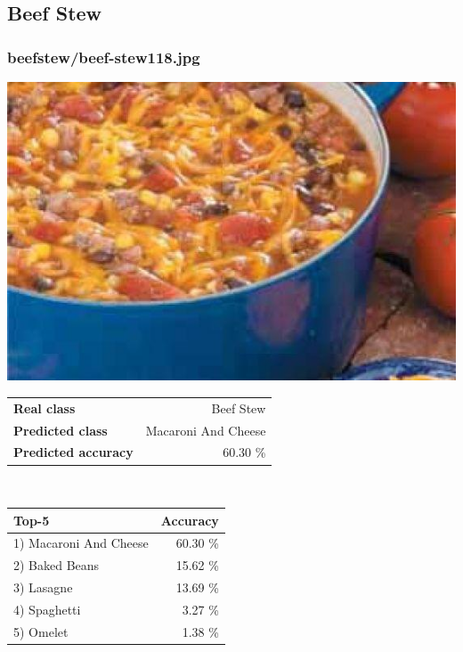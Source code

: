 \subsection{Beef Stew}
    
\subsubsection{beef\textunderscore stew/beef-stew118.jpg}

\begin{minipage}[t]{0.4\textwidth}
	\vspace{0pt}
	\includegraphics[width=\linewidth]{images/evaluation-images/beef_stew/beef-stew118.jpg}
\end{minipage}
\hfill
\begin{minipage}[t]{0.5\textwidth}
	\vspace{0pt}\raggedright
	\begin{tabularx}{\textwidth}{X r}
		\small \textbf{Real class} & \small Beef Stew\\
		\small \textbf{Predicted class} & \small Macaroni And Cheese\\
		\small \textbf{Predicted accuracy} & \small 60.30 \%
    \end{tabularx}\\
    
    \vspace{6pt}
	\begin{tabularx}{\textwidth}{X r}
        \small \textbf{Top-5} & \small \textbf{Accuracy} \\
        \hline
		\small 1) Macaroni And Cheese & \small 60.30 \%\\\small 2) Baked Beans & \small 15.62 \%\\\small 3) Lasagne & \small 13.69 \%\\\small 4) Spaghetti & \small 3.27 \%\\\small 5) Omelet & \small 1.38 \%
    \end{tabularx}
\end{minipage}
    
